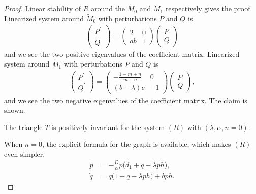 \documentclass[a4paper,11pt]{article}
\def\blue{\color{blue}}
\begin{document}
\begin{proof}
Linear stability of $R$ around the $\tilde{M}_0$ and $\tilde{M}_1$ respectively gives the proof. Linearized system around $\tilde{M}_0$ with perturbations $P$ and $Q$ is
{\blue
\begin{align*}
 \begin{pmatrix} {P}^\prime\\ {Q}^\prime \end{pmatrix} =
 \begin{pmatrix} 2 & 0 \\  ab & 1 \end{pmatrix} \begin{pmatrix} {P}\\ {Q} \end{pmatrix}
\end{align*}
}
and we see the two positive eigenvalues of the coefficient matrix. Linearized system around $\tilde{M}_1$ with perturbations $P$ and $Q$ is
{\blue
\begin{align*}
 \begin{pmatrix} {P}^\prime\\ {Q}^\prime \end{pmatrix} =
 \begin{pmatrix} -\frac{1-m+n}{m-n} & 0 \\  (b- \lambda)c & -1 \end{pmatrix} \begin{pmatrix} {P}\\ {Q} \end{pmatrix},
\end{align*}
}
and we see the two negative eigenvalues of the coefficient matrix. The claim is shown.

\medskip
{}
The triangle $T$  is positively invariant for the system $(R)$ with $(\lambda,\alpha,n=0)$.
\medskip

When $n=0$, the explicit formula for the graph is available, which makes $(R)$ even simpler,
\begin{align*}
 \dot{p} &= -\frac{D}{\alpha} p\Big(d_1+q+\lambda p h\Big),\\
 \dot{q} &= q\Big(1-q-\lambda p h\Big) + b p h.
\end{align*}




\end{proof}
\end{document}
